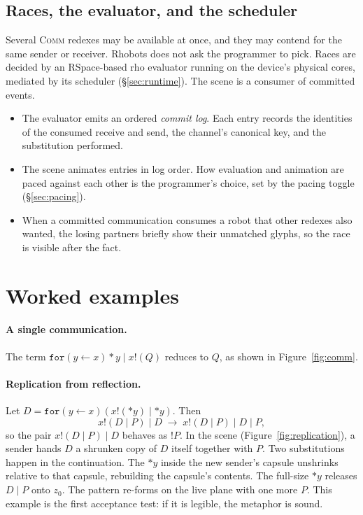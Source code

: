 \documentclass[11pt]{article}
\newcommand{\recv}[3]{\mathtt{for}(#1 \leftarrow #2)#3}
\newcommand{\send}[2]{#1!(#2)}
\newcommand{\drop}[1]{{*}#1}
\newcommand{\zlive}{z_0}
\begin{document}
\subsection{Races, the evaluator, and the scheduler}\label{sec:races}
Several \textsc{Comm} redexes may be available at once, and they may contend for the same
sender or receiver. Rhobots does not ask the programmer to pick. Races are decided by an
RSpace-based rho evaluator running on the device's physical cores, mediated by its
scheduler (\S\ref{sec:runtime}). The scene is a consumer of committed events.
\begin{itemize}
  \item The evaluator emits an ordered \emph{commit log}. Each entry records the identities
    of the consumed receive and send, the channel's canonical key, and the substitution
    performed.
  \item The scene animates entries in log order. How evaluation and animation are paced
    against each other is the programmer's choice, set by the pacing toggle (\S\ref{sec:pacing}).
  \item When a committed communication consumes a robot that other redexes also wanted, the
    losing partners briefly show their unmatched glyphs, so the race is visible after the fact.
\end{itemize}

\section{Worked examples}\label{sec:examples}

\paragraph{A single communication.} The term $\recv{y}{x}{\drop{y}} \mid \send{x}{Q}$
reduces to $Q$, as shown in Figure~\ref{fig:comm}.

\paragraph{Replication from reflection.} Let $D = \recv{y}{x}{(\send{x}{\drop{y}} \mid \drop{y})}$.
Then
\[
\send{x}{D \mid P} \mid D \;\to\; \send{x}{D \mid P} \mid D \mid P ,
\]
so the pair $\send{x}{D \mid P} \mid D$ behaves as ${!}P$. In the scene
(Figure~\ref{fig:replication}), a sender hands $D$ a shrunken copy of $D$ itself together
with $P$. Two substitutions happen in the continuation. The $\drop{y}$ inside the new
sender's capsule unshrinks relative to that capsule, rebuilding the capsule's contents.
The full-size $\drop{y}$ releases $D \mid P$ onto $\zlive$. The pattern re-forms on the
live plane with one more $P$. This example is the first acceptance test: if it is legible,
the metaphor is sound.
\end{document}
